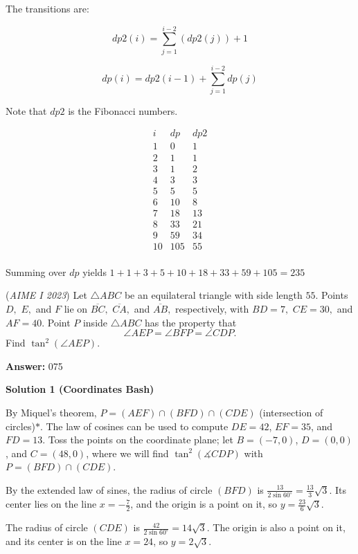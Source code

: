 \begin{enumerate}
{{ The transitions are:

 
 \[dp2(i)=\sum_{j=1}^{i-2}(dp2(j))+1\]

 \[dp(i)=dp2(i-1)+\sum_{j=1}^{i-2}dp(j)\]

 Note that $dp2$ is the Fibonacci numbers. 

 
 \[\begin{array}{rcl} i & dp & dp2\\ \hline 1 & 0 & 1 \\ 2 & 1 & 1 \\ 3 & 1 & 2 \\ 4 & 3 & 3 \\ 5 & 5 & 5 \\ 6 & 10 & 8 \\ 7 & 18 & 13 \\ 8 & 33 & 21 \\ 9 & 59 & 34 \\ 10 & 105 & 55 \\ \end{array}\]

 Summing over $dp$ yields $1+1+3+5+10+18+33+59+105=\boxed{235}$



	\item (\textit{AIME I 2023}) Let $\triangle ABC$ be an equilateral triangle with side length $55.$ Points $D,$ $E,$ and $F$ lie on $\overline{BC},$ $\overline{CA},$ and $\overline{AB},$ respectively, with $BD = 7,$ $CE=30,$ and $AF=40.$ Point $P$ inside $\triangle ABC$ has the property that 
 \[\angle AEP = \angle BFP = \angle CDP.\] Find $\tan^2(\angle AEP).$

 \textbf{Answer: }075



\textbf{Solution 1 (Coordinates Bash)}

By Miquel's theorem, $P=(AEF)\cap(BFD)\cap(CDE)$ (intersection of circles)$\text{*}$. The law of cosines can be used to compute $DE=42$, $EF=35$, and $FD=13$. Toss the points on the coordinate plane; let $B=(-7, 0)$, $D=(0, 0)$, and $C=(48, 0)$, where we will find $\tan^{2}\left(\measuredangle CDP\right)$ with $P=(BFD)\cap(CDE)$.

 By the extended law of sines, the radius of circle $(BFD)$ is $\frac{13}{2\sin 60^{\circ}}=\frac{13}{3}\sqrt{3}$. Its center lies on the line $x=-\frac{7}{2}$, and the origin is a point on it, so $y=\frac{23}{6}\sqrt{3}$.

 The radius of circle $(CDE)$ is $\frac{42}{2\sin 60^{\circ}}=14\sqrt{3}$. The origin is also a point on it, and its center is on the line $x=24$, so $y=2\sqrt{3}$.

}}
\end{enumerate}
